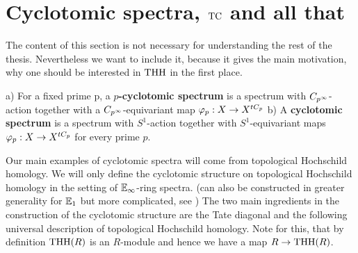 \section{Cyclotomic spectra, $\operatorname{TC}$ and all that}
The content of this section is not necessary for understanding the rest of the thesis. Nevertheless we want to include it, because it gives the main motivation, why one should be interested in $\operatorname{THH}$ in the first place. 



\begin{defn}\cite[Chapter~2.1]{NS}
a) For a fixed prime p, a \textbf{$p$-cyclotomic spectrum} is a spectrum with $C_{p^\infty}$-action together with a $C_{p^\infty}$-equivariant map $\varphi_p: X \rightarrow X^{tC_p}$ \newline
b) A \textbf{cyclotomic spectrum} is a spectrum with $S^1$-action together with  $S^1$-equivariant maps $\varphi_p: X \rightarrow X^{tC_p}$ for every prime $p$.
\end{defn}

Our main examples of cyclotomic spectra will come from topological Hochschild homology.
We will only define the cyclotomic structure on topological Hochschild homology in the setting of $\mathbb{E}_\infty$-ring spectra. (can also be constructed in greater generality for $\mathbb{E}_1$ but more complicated, see \cite[Chapter~3.1]{NS})
The two main ingredients in the construction of the cyclotomic structure are the Tate diagonal and the following universal description of topological Hochschild homology. Note for this, that by definition $\operatorname{THH}(R)$ is an $R$-module and hence we have a map $R\rightarrow\operatorname{THH}(R)$.

